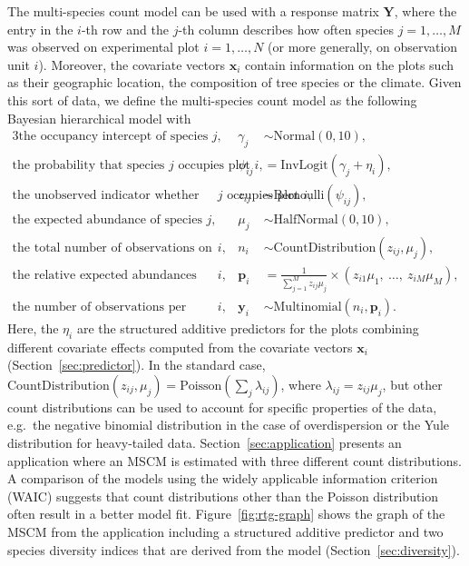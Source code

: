 \documentclass{article}
\newcommand{\Ymat}{\mathbf{Y}}
\newcommand{\pvec}{\bm{p}}
\newcommand{\xvec}{\bm{x}}
\newcommand{\yvec}{\bm{y}}
\begin{document}
The multi-species count model can be used with a response matrix $\Ymat$, where the entry in the $i$-th row and the $j$-th column describes how often species $j = 1, \dots, M$ was observed on experimental plot $i = 1, \dots, N$ (or more generally, on observation unit $i$). Moreover, the covariate vectors $\xvec_i$ contain information on the plots such as their geographic location, the composition of tree species or the climate. Given this sort of data, we define the multi-species count model as the following Bayesian hierarchical model with
\begin{alignat*}{3}
                        \text{the occupancy intercept of species $j$,~~~}  &&\gamma_j &\sim \text{Normal}(0, 10), \\
            \text{the probability that species $j$ occupies plot $i$,~~~} &&\psi_{ij} &=    \text{InvLogit}(\gamma_j + \eta_i), \\
\text{the unobserved indicator whether species $j$ occupies plot $i$,~~~}    &&z_{ij} &\sim \text{Bernoulli}(\psi_{ij}), \\
                         \text{the expected abundance of species $j$,~~~}     &&\mu_j &\sim \text{HalfNormal}(0, 10), \\
                  \text{the total number of observations on plot $i$,~~~}       &&n_i &\sim \text{CountDistribution}(z_{ij}, \mu_j), \\
      \text{the relative expected abundances per species on plot $i$,~~~}   &&\pvec_i &=    \frac{1}{\sum_{j=1}^M z_{ij} \mu_j} \times (z_{i1} \mu_1,\ \dots,\ z_{iM} \mu_M), \\
            \text{the number of observations per species on plot $i$,~~~}   &&\yvec_i &\sim \text{Multinomial}(n_i, \pvec_i).
\end{alignat*}
Here, the $\eta_i$ are the structured additive predictors for the plots combining different covariate effects computed from the covariate vectors $\xvec_i$ (Section~\ref{sec:predictor}). In the standard case, $\text{CountDistribution}(z_{ij}, \mu_j) = \text{Poisson}(\sum_j\lambda_{ij})$, where $\lambda_{ij} = z_{ij}\mu_j$, but other count distributions can be used to account for specific properties of the data, e.g.~the negative binomial distribution in the case of overdispersion or the Yule distribution for heavy-tailed data. Section~\ref{sec:application} presents an application where an MSCM is estimated with three different count distributions. A comparison of the models using the widely applicable information criterion (WAIC) suggests that count distributions other than the Poisson distribution often result in a better model fit. Figure~\ref{fig:rtg-graph} shows the graph of the MSCM from the application including a structured additive predictor and two species diversity indices that are derived from the model (Section~\ref{sec:diversity}).
\end{document}
